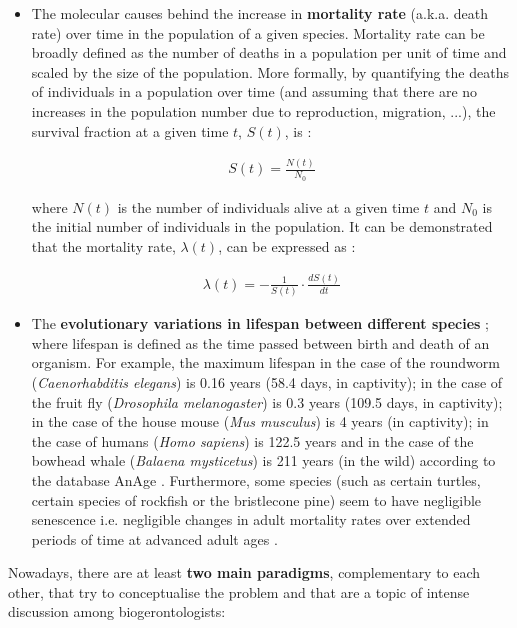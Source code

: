 \begin{itemize}
	
	\item The molecular causes behind the increase in \textbf{mortality rate} (a.k.a. death rate) over time in the population of a given species. Mortality rate can be broadly defined as the number of deaths in a population per unit of time and scaled by the size of the population. More formally, by quantifying the deaths of individuals in a population over time (and assuming that there are no increases in the population number due to reproduction, migration, ...), the survival fraction at a given time $t$, $S(t)$, is \cite{Witten1986}:
	
	\begin{align} \label{eq:1.1}
	S(t) = \frac{N(t)}{N_0}
	\end{align}
	
	where $N(t)$ is the number of individuals alive at a given time $t$ and $N_0$ is the initial number of individuals in the population. It can be demonstrated that the mortality rate, $\lambda(t)$, can be expressed as \cite{Witten1986}:
	
	\begin{align} \label{eq:1.2}
	\lambda(t) = - \frac{1}{S(t)} \cdot \frac{dS(t)}{dt}
	\end{align}
	
	\item The \textbf{evolutionary variations in lifespan between different species} \cite{Jones2013}; where lifespan is defined as the time passed between birth and death of an organism. For example, the maximum lifespan in the case of the roundworm (\textit{Caenorhabditis elegans}) is 0.16 years (58.4 days, in captivity); in the case of the fruit fly (\textit{Drosophila melanogaster}) is 0.3 years (109.5 days, in captivity); in the case of the house mouse (\textit{Mus musculus}) is 4 years (in captivity); in the case of humans (\textit{Homo sapiens}) is 122.5 years and in the case of the bowhead whale (\textit{Balaena mysticetus}) is 211 years (in the wild) according to the database AnAge \cite{DEMAGALHAES2009}. Furthermore, some species (such as certain turtles, certain species of rockfish or the bristlecone pine) seem to have negligible senescence i.e. negligible changes in adult mortality rates over extended periods of time at advanced adult ages \cite{Finch2009}.   
	
\end{itemize}

Nowadays, there are at least \textbf{two main paradigms}, complementary to each other, that try to conceptualise the problem and that are a topic of intense discussion among biogerontologists:

